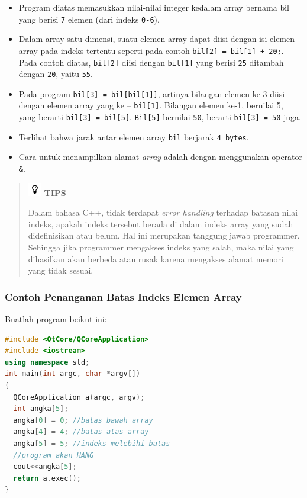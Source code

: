 \begin{itemize}

\item
  Program diatas memasukkan nilai-nilai integer kedalam array bernama
  bil yang berisi \texttt{7} elemen (dari indeks \texttt{0-6}).
\item
  Dalam array satu dimensi, suatu elemen array dapat diisi dengan isi
  elemen array pada indeks tertentu seperti pada contoh
  \texttt{bil{[}2{]}\ =\ bil{[}1{]}\ +\ 20;}. Pada contoh diatas,
  \texttt{bil{[}2{]}} diisi dengan \texttt{bil{[}1{]}} yang berisi
  \texttt{25} ditambah dengan \texttt{20}, yaitu \texttt{55}.
\item
  Pada program \texttt{bil{[}3{]}\ =\ bil{[}bil{[}1{]}{]}}, artinya
  bilangan elemen ke-3 diisi dengan elemen array yang ke --
  \texttt{bil{[}1{]}}. Bilangan elemen ke-1, bernilai 5, yang berarti
  \texttt{bil{[}3{]}\ =\ bil{[}5{]}}. \texttt{Bil{[}5{]}} bernilai
  \texttt{50}, berarti \texttt{bil{[}3{]}\ =\ 50} juga.
\item
  Terlihat bahwa jarak antar elemen array \texttt{bil} berjarak
  \texttt{4\ bytes}.
\item
  Cara untuk menampilkan alamat \emph{array} adalah dengan menggunakan
  operator \texttt{\&}.
\end{itemize}
\begin{quotation}
\includegraphics{../manuscript/images/tips.png}	\textbf{TIPS} 
	
	Dalam
	bahasa C++, tidak terdapat \emph{error handling} terhadap batasan nilai
	indeks, apakah indeks tersebut berada di dalam indeks array yang sudah
	didefinisikan atau belum. Hal ini merupakan tanggung jawab programmer.
	Sehingga jika programmer mengakses indeks yang salah, maka nilai yang
	dihasilkan akan berbeda atau rusak karena mengakses alamat memori yang
	tidak sesuai.
\end{quotation}
 

\subsubsection*{Contoh  Penanganan Batas Indeks Elemen Array}

Buatlah program beikut ini:

\begin{lstlisting}[language=c++, caption=Penanganan Batas Indeks Elemen Array, label=contoh3-3]
#include <QtCore/QCoreApplication>
#include <iostream>
using namespace std;
int main(int argc, char *argv[])
{
  QCoreApplication a(argc, argv);
  int angka[5];
  angka[0] = 0; //batas bawah array
  angka[4] = 4; //batas atas array
  angka[5] = 5; //indeks melebihi batas
  //program akan HANG
  cout<<angka[5];
  return a.exec();
}
\end{lstlisting}


